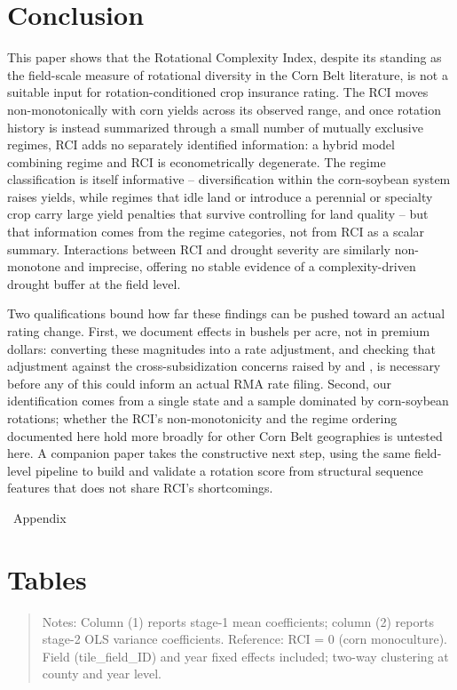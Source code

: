 \documentclass[12pt,letterpaper]{article}
\theoremstyle{remark}
\theoremstyle{remark}
\theoremstyle{plain}
\theoremstyle{definition}
\begin{document}
\section{\label{sec:conclusion}Conclusion}

This paper shows that the Rotational Complexity Index, despite its standing as the field-scale measure of rotational diversity in the Corn Belt literature, is not a suitable input for rotation-conditioned crop insurance rating. The RCI moves non-monotonically with corn yields across its observed range, and once rotation history is instead summarized through a small number of mutually exclusive regimes, RCI adds no separately identified information: a hybrid model combining regime and RCI is econometrically degenerate. The regime classification is itself informative -- diversification within the corn-soybean system raises yields, while regimes that idle land or introduce a perennial or specialty crop carry large yield penalties that survive controlling for land quality -- but that information comes from the regime categories, not from RCI as a scalar summary. Interactions between RCI and drought severity are similarly non-monotone and imprecise, offering no stable evidence of a complexity-driven drought buffer at the field level.

Two qualifications bound how far these findings can be pushed toward an actual rating change. First, we document effects in bushels per acre, not in premium dollars: converting these magnitudes into a rate adjustment, and checking that adjustment against the cross-subsidization concerns raised by \citet{Ramaswami1993} and \citet{Babcock1996}, is necessary before any of this could inform an actual RMA rate filing. Second, our identification comes from a single state and a sample dominated by corn-soybean rotations; whether the RCI's non-monotonicity and the regime ordering documented here hold more broadly for other Corn Belt geographies is untested here. A companion paper takes the constructive next step, using the same field-level pipeline to build and validate a rotation score from structural sequence features that does not share RCI's shortcomings.

\newpage


\newpage
\ Appendix

\section*{Tables}


\begin{quote}
\small
Notes: Column (1) reports stage-1 mean coefficients; column (2) reports stage-2 OLS variance coefficients. Reference: RCI = 0 (corn monoculture). Field (tile\_field\_ID) and year fixed effects included; two-way clustering at county and year level.
\end{quote}
\end{document}
